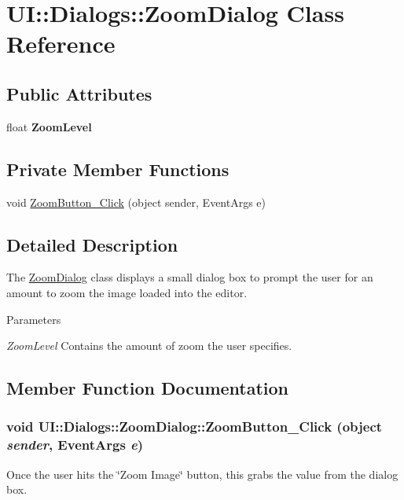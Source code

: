 \hypertarget{class_u_i_1_1_dialogs_1_1_zoom_dialog}{
\section{UI::Dialogs::ZoomDialog Class Reference}
\label{class_u_i_1_1_dialogs_1_1_zoom_dialog}
}
\subsection*{Public Attributes}
\begin{DoxyCompactItemize}
\item 
\hypertarget{class_u_i_1_1_dialogs_1_1_zoom_dialog_a9754c8893f67b53966a7d3fa2a0ab589}{
float {\bfseries ZoomLevel}}
\label{class_u_i_1_1_dialogs_1_1_zoom_dialog_a9754c8893f67b53966a7d3fa2a0ab589}

\end{DoxyCompactItemize}
\subsection*{Private Member Functions}
\begin{DoxyCompactItemize}
\item 
void \hyperlink{class_u_i_1_1_dialogs_1_1_zoom_dialog_a58177c94bbb26f0964321e634a52d22e}{ZoomButton\_\-Click} (object sender, EventArgs e)
\end{DoxyCompactItemize}


\subsection{Detailed Description}
The \hyperlink{class_u_i_1_1_dialogs_1_1_zoom_dialog}{ZoomDialog} class displays a small dialog box to prompt the user for an amount to zoom the image loaded into the editor.


\begin{DoxyParams}{Parameters}
\item[{\em ZoomLevel}]Contains the amount of zoom the user specifies. \end{DoxyParams}


\subsection{Member Function Documentation}
\hypertarget{class_u_i_1_1_dialogs_1_1_zoom_dialog_a58177c94bbb26f0964321e634a52d22e}{
\subsubsection[{ZoomButton\_\-Click}]{\setlength{\rightskip}{0pt plus 5cm}void UI::Dialogs::ZoomDialog::ZoomButton\_\-Click (object {\em sender}, \/  EventArgs {\em e})}}
\label{class_u_i_1_1_dialogs_1_1_zoom_dialog_a58177c94bbb26f0964321e634a52d22e}
Once the user hits the \char`\"{}Zoom Image\char`\"{} button, this grabs the value from the dialog box. 

